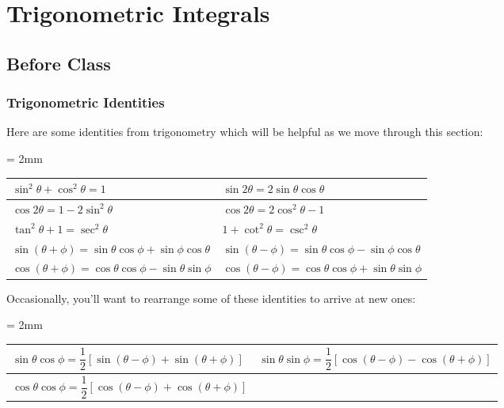 \documentclass[notes]{subfiles}
\begin{document}
	\fancyhead[LO,RE]{\bfseries \small \currentname}
	\fancyfoot[C]{{}}
	\fancyfoot[RO,LE]{\large \thepage}	%
	
\section*{Trigonometric Integrals}\label{cs72}
	\subsection*{Before Class}
	\subsubsection*{Trigonometric Identities}
		Here are some identities from trigonometry which will be helpful as we move through this section:
		\begin{center}
			\tabulinesep = 2mm
			\begin{tabu}to .8\textwidth {| X[c]| X[c] |}\hline
				$\sin^2\theta + \cos^2\theta = 1$	& $\sin 2\theta = 2\sin\theta\cos\theta$ \\ \hline
				$\cos 2\theta =1-2\sin^2\theta$		& $\cos 2\theta = 2\cos^2\theta - 1$\\ \hline
				$\tan^2\theta + 1 = \sec^2\theta$	& $1 + \cot^2\theta = \csc^2\theta$\\ \hline
				$\sin (\theta + \phi) = \sin\theta\cos\phi + \sin\phi\cos\theta$ & $\sin(\theta - \phi) =\sin\theta\cos\phi -\sin\phi\cos\theta$\\ \hline
				$\cos (\theta + \phi) = \cos\theta\cos\phi - \sin\theta\sin\phi$ & $\cos(\theta - \phi) = \cos\theta\cos\phi + \sin\theta\sin\phi$\\ \hline
			\end{tabu}
		\end{center}
			\vspace{.5in}
			
		Occasionally, you'll want to rearrange some of these identities to arrive at new ones:		
		\begin{center}
			\tabulinesep = 2mm
			\begin{tabu}to .8\textwidth {| X[c]| X[c] |}\hline
				$\sin\theta\cos\phi = \dfrac{1}{2}[\sin(\theta - \phi) + \sin (\theta + \phi)]$ & $\sin\theta\sin\phi = \dfrac{1}{2}[\cos(\theta - \phi) - \cos(\theta + \phi)]$\\ \hline 
				$\cos\theta\cos\phi =\dfrac{1}{2}[\cos(\theta-\phi) + \cos (\theta + \phi)]$ & \\ \hline
			\end{tabu}
		\end{center}
	
\end{document}

